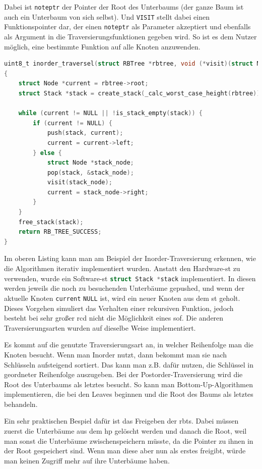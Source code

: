 \documentclass[11pt]{article}
\newcommand{\lstin}[1]{\lstinline[language=C]{#1}}
\begin{document}
Dabei ist \lstin{noteptr} der Pointer der Root des Unterbaums (der ganze Baum ist auch ein Unterbaum von sich selbst). Und \lstin{VISIT} stellt dabei einen Funktionspointer dar, der einen \lstin{noteptr} als Parameter akzeptiert und ebenfalls als Argument in die Traversierungsfunktionen gegeben wird.
So ist es dem Nutzer möglich, eine bestimmte Funktion auf alle Knoten anzuwenden.

\begin{lstlisting}[language=C]
uint8_t inorder_traversel(struct RBTree *rbtree, void (*visit)(struct Node*))
{
    struct Node *current = rbtree->root;
    struct Stack *stack = create_stack(_calc_worst_case_height(rbtree));

    while (current != NULL || !is_stack_empty(stack)) {
        if (current != NULL) {
            push(stack, current);
            current = current->left;
        } else {
            struct Node *stack_node;
            pop(stack, &stack_node);
            visit(stack_node);
            current = stack_node->right;
        }
    }
    free_stack(stack);
    return RB_TREE_SUCCESS;
}
\end{lstlisting}

Im oberen Listing kann man am Beispiel der Inorder-Traversierung erkennen, wie die Algorithmen iterativ implementiert wurden. Anstatt den Hardware-\gls{st} zu verwenden, wurde ein Software-\gls{st} \lstin{struct Stack *stack} implementiert.
In diesen werden jeweils die noch zu besuchenden Unterbäume gepushed, und wenn der aktuelle Knoten \lstin{current} \lstin{NULL} ist, wird ein neuer Knoten aus dem \gls{st} geholt.
Dieses Vorgehen simuliert das Verhalten einer rekursiven Funktion, jedoch besteht bei sehr großer \gls{rcd} nicht die Möglichkeit eines \gls{sof}. Die anderen Traversierungsarten wurden auf dieselbe Weise implementiert.

Es kommt auf die genutzte Traversierungsart an, in welcher Reihenfolge man die Knoten besucht. Wenn man Inorder nutzt, dann bekommt man sie nach Schlüsseln aufsteigend sortiert. Das kann man z.B. dafür nutzen, die Schlüssel in geordneter Reihenfolge auszugeben.
Bei der Postorder-Traversierung wird die Root des Unterbaums als letztes besucht. So kann man Bottom-Up-Algorithmen implementieren, die bei den Leaves beginnen und die Root des Baums als letztes behandeln.

Ein sehr praktischen Bespiel dafür ist das Freigeben der \glspl{rbt}. Dabei müssen zuerst die Unterbäume aus dem \gls{hp} gelöscht werden und danach die Root, weil man sonst die Unterbäume zwischenspeichern müsste, da die Pointer zu ihnen in der Root gespeichert sind.
Wenn man diese aber nun als erstes freigibt, würde man keinen Zugriff mehr auf ihre Unterbäume haben.
\end{document}
